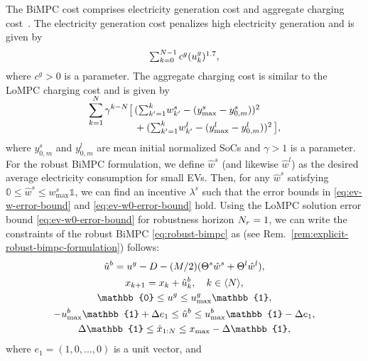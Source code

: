 The BiMPC cost comprises electricity generation cost and aggregate charging cost~\cite{zou2017efficient}.
The electricity generation cost penalizes high electricity generation and is given by
\begin{equation}
\label{eq:ev-bimpc-generation-cost}
    \textstyle{\sum}_{k=0}^{N-1} \, c^g (u^g_k)^{1.7},
\end{equation}
where $c^g > 0$ is a parameter.
The aggregate charging cost is similar to the LoMPC charging cost and is given by
\begin{align}
\label{eq:ev-bimpc-tracking-cost}
    \smash{\sum_{k=1}^N} \, \gamma^{k-N} \bigl[ \, & ( \textstyle{\sum}_{k'=1}^k w^s_{k'} - (y^s_\text{max} - y^s_{0, m}))^2 \\
    & + ( \textstyle{\sum}_{k'=1}^k w^l_{k'} - (y^l_\text{max} - y^l_{0, m}))^2 \,\bigr], \nonumber
\end{align}
where $y^s_{0, m}$ and $y^l_{0, m}$ are mean initial normalized SoCs and $\gamma > 1$ is a parameter.
For the robust BiMPC formulation, we define $\hat{w}^s$ (and likewise $\hat{w}^l$) as the desired average electricity consumption for small EVs.
Then, for any $\hat{w}^s$ satisfying $\mathbb{0} \leq \hat{w}^s \leq w^s_\text{max} \mathbb{1}$, we can find an incentive $\lambda^s$ such that the error bounds in \eqref{eq:ev-w-error-bound} and \eqref{eq:ev-w0-error-bound} hold.
Using the LoMPC solution error bound \eqref{eq:ev-w0-error-bound} for robustness horizon $N_r = 1$, we can write the constraints of the robust BiMPC \eqref{eq:robust-bimpc} as (see Rem.~\ref{rem:explicit-robust-bimpc-formulation}) follows:
\begin{equation}
\label{eq:ev-robust-bimpc-constraints}
\begin{gathered}
    \hat{u}^b = u^g - D - (M/2)(\Theta^s \hat{w}^s + \Theta^l \hat{w}^l), \\
    x_{k+1} = x_k + \hat{u}^b_k, \quad k \in \langle N\rangle, \\
    \mathbb{0} \leq u^g \leq u^g_\text{max} \mathbb{1}, \\
    -u^b_\text{max}\mathbb{1} + \Delta e_1 \leq \hat{u}^b \leq u^b_\text{max}\mathbb{1} - \Delta e_1, \\
    \Delta \mathbb{1} \leq \hat{x}_{1:\horizon} \leq x_\text{max} - \Delta \mathbb{1},
\end{gathered}
\end{equation}
where $e_1 = (1, 0, ..., 0)$ is a unit vector, and
